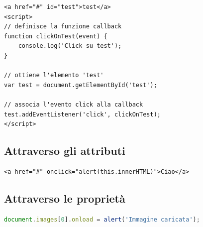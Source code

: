 \begin{lstlisting}[language=HTML5]
<a href="#" id="test">test</a>
<script>
// definisce la funzione callback
function clickOnTest(event) {
    console.log('Click su test');
}

// ottiene l'elemento 'test'
var test = document.getElementById('test');

// associa l'evento click alla callback
test.addEventListener('click', clickOnTest);
</script>
\end{lstlisting}

\subsection{Attraverso gli attributi}

\begin{lstlisting}[language=HTML5]
<a href="#" onclick="alert(this.innerHTML)">Ciao</a>
\end{lstlisting}

\subsection{Attraverso le proprietà}

\begin{lstlisting}[language=JavaScript]
document.images[0].onload = alert('Immagine caricata');
\end{lstlisting}
